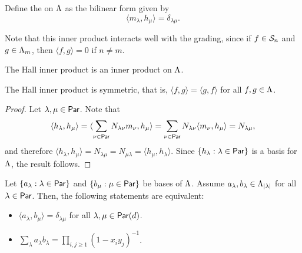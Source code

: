 \begin{definition}
	Define the  on \(\operatorname{\Lambda}\) as the bilinear form given by
	\begin{equation}
		\langle m_\lambda, h_\mu \rangle = \delta_{\lambda\mu}.
	\end{equation}
\end{definition}

Note that this inner product interacts well with the grading,
since if \(f \in \mathcal{S}_{n}\) and \(g \in \operatorname{\Lambda}_m\),
then \(\langle f, g \rangle = 0\) if \(n \neq m\).

\begin{proposition} \label{prop:hall-inner-product-is-inner-product}
	The Hall inner product is an inner product on \(\operatorname{\Lambda}\).
\end{proposition}

\begin{lemma} \label{prop:hall-is-symmetric}
	The Hall inner product is symmetric,
	that is,
	\(\langle f, g \rangle = \langle g, f \rangle\)
	for all \(f, g \in \operatorname{\Lambda}\).
\end{lemma}

\begin{proof}
	Let \(\lambda, \mu \in \operatorname{\mathsf{Par}}\).
	Note that
	\begin{equation}
		\langle h_\lambda, h_\mu \rangle
		= \langle \sum_{\nu \in \operatorname{\mathsf{Par}}} N_{\lambda\nu} m_\nu, h_\mu \rangle
		= \sum_{\nu \in \operatorname{\mathsf{Par}}} N_{\lambda\nu} \langle m_\nu, h_\mu \rangle
		= N_{\lambda\mu},
	\end{equation}
	and therefore \(\langle h_\lambda, h_\mu \rangle = N_{\lambda\mu} = N_{\mu\lambda} = \langle h_\mu, h_\lambda \rangle\).
	Since \(\{h_\lambda : \lambda \in \operatorname{\mathsf{Par}}\}\) is a basis for \(\operatorname{\Lambda}\), the result follows.
\end{proof}

\begin{lemma} \label{prop:othogonal-bases-characterization}
	Let \(\{a_\lambda : \lambda \in \operatorname{\mathsf{Par}}\}\) and \(\{b_\mu : \mu \in \operatorname{\mathsf{Par}}\}\) be bases of \(\operatorname{\Lambda}\).
	Assume \(a_\lambda, b_\lambda \in \operatorname{\Lambda}_{|\lambda|}\) for all \(\lambda \in \operatorname{\mathsf{Par}}\).
	Then, the following statements are equivalent:
	\begin{itemize}
		\item \(\langle a_\lambda, b_\mu \rangle = \delta_{\lambda\mu}\) for all \(\lambda, \mu \in \operatorname{\mathsf{Par}}(d)\).
		\item \(\sum_{\lambda} a_\lambda b_\lambda = \prod_{i,j \geq 1} (1 - x_iy_j)^{-1}\).
	\end{itemize}
\end{lemma}

